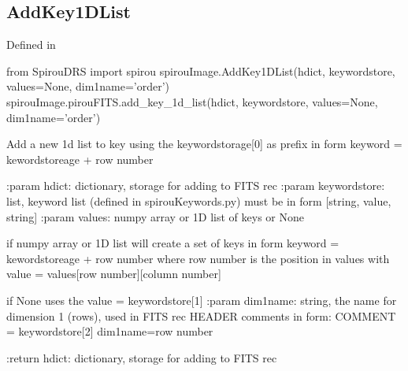 \begin{minipage}{\textwidth}
\subsection{AddKey1DList}

Defined in \spirouImage{}

\begin{pythonbox}
from SpirouDRS import spirou
spirouImage.AddKey1DList(hdict, keywordstore, values=None, dim1name='order')
spirouImage.pirouFITS.add_key_1d_list(hdict, keywordstore, values=None, dim1name='order')
\end{pythonbox}

\begin{pythondocstring}
Add a new 1d list to key using the keywordstorage[0] as prefix in form
keyword = kewordstoreage + row number

:param hdict: dictionary, storage for adding to FITS rec
:param keywordstore: list, keyword list (defined in spirouKeywords.py)
                     must be in form [string, value, string]
:param values: numpy array or 1D list of keys or None

              if numpy array or 1D list will create a set of keys in form
              keyword = kewordstoreage + row number
              where row number is the position in values
              with value = values[row number][column number]

              if None uses the value = keywordstore[1]
:param dim1name: string, the name for dimension 1 (rows), used in FITS rec
                 HEADER comments in form:
      COMMENT = keywordstore[2] dim1name={row number}

:return hdict: dictionary, storage for adding to FITS rec
\end{pythondocstring}
\end{minipage}

